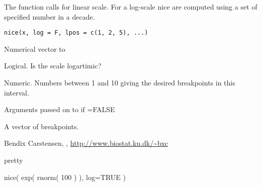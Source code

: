 \begin{Description}\relax
The function calls 
for linear scale. For a log-scale nice are computed using a set of
specified number in a decade.
\end{Description}
\begin{Usage}
\begin{verbatim}
nice(x, log = F, lpos = c(1, 2, 5), ...)
\end{verbatim}
\end{Usage}
\begin{Arguments}
\begin{ldescription}
\item[\code{x}] Numerical vector to
\item[\code{log}] Logical. Is the scale logartimic?
\item[\code{lpos}] Numeric. Numbers between 1 and 10 giving the desired
breakpoints in this interval.
\item[\code{...}] Arguments passed on to  if =FALSE
\end{ldescription}
\end{Arguments}
\begin{Value}
A vector of breakpoints.
\end{Value}
\begin{Author}\relax
Bendix Carstensen, , \url{http://www.biostat.ku.dk/~bxc}
\end{Author}
\begin{SeeAlso}\relax
pretty
\end{SeeAlso}
\begin{Examples}
\begin{ExampleCode}
nice( exp( rnorm( 100 ) ), log=TRUE )
\end{ExampleCode}
\end{Examples}


